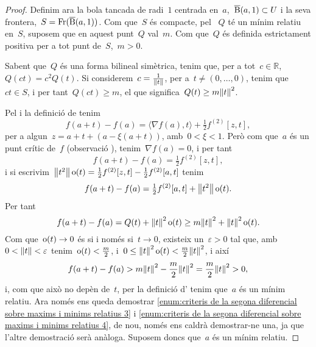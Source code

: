 \documentclass[../../main.tex]{subfiles}
\begin{document}
\begin{proposition}
\begin{proof}
            Definim ara la bola tancada de radi~\(1\) centrada en~\(a\),~\(\overline{\operatorname{B}}(a,1)\subset U\) i la seva frontera,~\(S=\operatorname{Fr}(\overline{\operatorname{B}}(a,1))\).
            Com que~\(S\) és compacte, pel  ~\(Q\) té un mínim relatiu en~\(S\), suposem que en aquest punt~\(Q\) val~\(m\).
            Com que~\(Q\) és definida estrictament positiva per a tot punt de~\(S\),~\(m>0\).

            Sabent que~\(Q\) és una forma bilineal simètrica, tenim que, per a tot~\(c\in\mathbb{R}\),~\(Q(ct)=c^{2}Q(t)\).
            Si considerem~\(c=\frac{1}{\norm{t}}\), per a~\(t\neq(0,\dots,0)\), tenim que~\(ct\in S\), i per tant~\(Q(ct)\geq m\), el que significa~\(Q(t)\geq m\norm{t} ^{2}\).

            Pel  i la definició de  tenim
            \[
                f(a+t)-f(a)=\langle\nabla f(a),t\rangle+\tfrac{1}{2}f^{(2)}[z,t],
            \]
            per a algun~\(z=a+t+(a-\xi(a+t))\), amb~\(0<\xi<1\).
            Però com que~\(a\) és un punt crític de~\(f\) (observació ), tenim~\(\nabla f(a)=0\), i per tant
            \[
                f(a+t)-f(a)=\tfrac{1}{2}f^{(2)}[z,t],
            \]
            i si escrivim~\(\norm{t^{2}}\omicron(t)=\frac{1}{2}f^{(2)}[z,t]-\frac{1}{2}f^{(2)}[a,t]\) tenim
            \[
                f(a+t)-f(a)=\tfrac{1}{2}f^{(2)}[a,t]+\norm{t^{2}}\omicron(t).
            \]
            Per tant
            \begin{equation}\label{eq:7}
            f(a+t)-f(a)=Q(t)+\norm{t}^{2}\omicron(t)\geq m\norm{t}^{2}+\norm{t}^{2}\omicron(t).
            \end{equation}
            Com que~\(\operatorname{o}(t)\to0\) és si i només si~\(t\to0\), existeix un~\(\varepsilon>0\) tal que, amb~\(0<\norm{t}<\varepsilon\) tenim~\(\operatorname{o}(t)<\frac{m}{2}\), i~\(0\leq\norm{t}^{2}\omicron(t)<\frac{m}{2}\norm{t}^{2}\), i així
            \[
                f(a+t)-f(a)>m\norm{t}^{2}-\frac{m}{2}\norm{t}^{2}=\frac{m}{2}\norm{t}^{2}>0,
            \]
            i, com que això no depèn de~\(t\), per la definició d' tenim que~\(a\) és un mínim relatiu.
            Ara només ens queda demostrar \eqref{enum:criteris de la segona diferencial sobre maxims i minims relatius 3} i \eqref{enum:criteris de la segona diferencial sobre maxims i minims relatius 4}, de nou, només ens caldrà demostrar-ne una, ja que l'altre demostració serà anàloga.
            Suposem doncs que~\(a\) és un mínim relatiu.


\end{proof}
\end{proposition}
\end{document}
